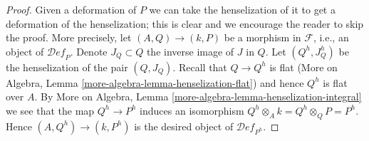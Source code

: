 \documentclass[10pt,a4paper]{amsart}
\theoremstyle{plain}
\theoremstyle{definition}
\theoremstyle{remark}
\numberwithin{equation}{subsection}
\def\Deformationcategory{\mathcal{D}\!\mathit{ef}}
\begin{document}
\begin{proof}
Given a deformation of $P$ we can take the henselization
of it to get a deformation of the henselization; this is
clear and we encourage the reader to skip the proof. More precisely,
let $(A, Q) \to (k, P)$ be a morphism in $\mathcal{F}$, i.e.,
an object of $\Deformationcategory_P$. Denote $J_Q \subset Q$ the inverse
image of $J$ in $Q$. Let $(Q^h, J_Q^h)$ be the henselization of
the pair $(Q, J_Q)$. Recall that $Q \to Q^h$ is flat
(More on Algebra, Lemma \ref{more-algebra-lemma-henselization-flat})
and hence $Q^h$ is flat over $A$.
By More on Algebra, Lemma \ref{more-algebra-lemma-henselization-integral}
we see that the map $Q^h \to P^h$ induces an isomorphism
$Q^h \otimes_A k = Q^h \otimes_Q P = P^h$.
Hence $(A, Q^h) \to (k, P^h)$ is the desired object of
$\Deformationcategory_{P^h}$.
\end{proof}
\end{document}
